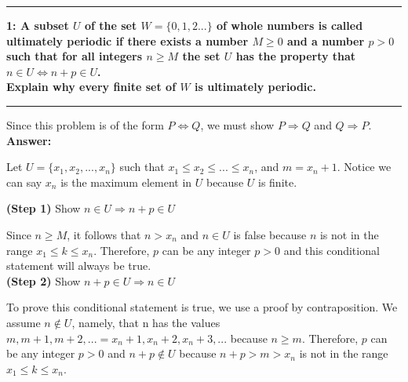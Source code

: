 \documentclass[11pt]{article}
\newcommand\question[2]{\vspace{.25in}\hrule\textbf{#1: #2}\vspace{.5em}\hrule\vspace{.10in}}
\renewcommand\part[1]{\vspace{.10in}\textbf{(#1)}}
\newcommand\answer{\vspace{.10in}\textbf{Answer: }}
\begin{document}
\raggedright
\newcommand\NAME{Stewart Dulaney}  %
\newcommand\SID{1545566}     %
\newcommand\HWNUM{6}              %

\question{1}{A subset $U$ of the set $W = \{0, 1, 2...\}$ of whole numbers is called ultimately periodic if there exists a number $M \geq 0$ and a number $p > 0$ such that for all integers $n \geq M$ the set $U$ has the property that $n \in U \iff n + p \in U$.\\[\baselineskip]Explain why every finite set of $W$ is ultimately periodic.} 

Since this problem is of the form $P \Leftrightarrow Q$, we must show $P \Rightarrow Q$ and $Q \Rightarrow P$.\\[\baselineskip]

\answer

Let $U = \{x_1, x_2, ..., x_n\}$ such that $x_1 \leq x_2 \leq ... \leq x_n$, and $m = x_n + 1$. Notice we can say $x_n$ is the maximum element in $U$ because $U$ is finite.

\part{Step 1} Show $n \in U \Rightarrow n + p \in U$

Since $n \geq M$, it follows that $n > x_n$ and $n \in U$ is false because $n$ is not in the range $x_1 \leq k \leq x_n$. Therefore, $p$ can be any integer $p > 0$ and this conditional statement will always be true.\\[\baselineskip]

\part{Step 2} Show $n + p \in U \Rightarrow n \in U$

To prove this conditional statement is true, we use a proof by contraposition. We assume $n \notin U$, namely, that n has the values $m, m + 1, m + 2, ... = x_n + 1, x_n + 2, x_n + 3, ...$ because $n \geq m$. Therefore, $p$ can be any integer $p > 0$ and $n + p \notin U$ because $n + p > m > x_n$ is not in the range $x_1 \leq k \leq x_n$.\\[\baselineskip]
\end{document}
